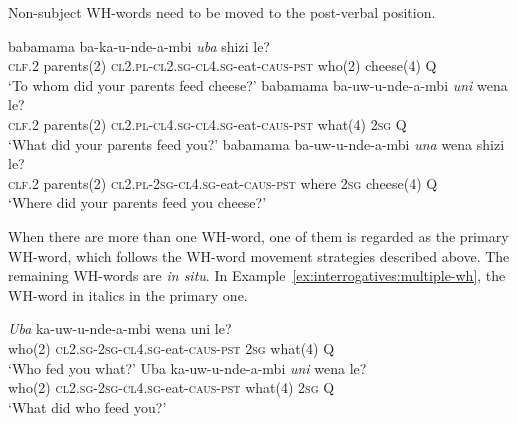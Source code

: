Non-subject WH-words need to be moved to the post-verbal position.

\begin{exe}
\ex
{} babamama ba-ka-u-nde-\textipa{\textbeltl}a-mbi \textit{uba} shizi le? \\
\textsc{clf.2} parents(2) \textsc{cl2.pl}-\textsc{cl2.sg}-\textsc{cl4.sg}-eat-\textsc{caus}-\textsc{pst} who(2) cheese(4) Q \\
\trans `To whom did your parents feed cheese?'
\ex
{} babamama ba-uw-u-nde-\textipa{\textbeltl}a-mbi \textit{uni} wena le? \\
\textsc{clf.2} parents(2) \textsc{cl2.pl}-\textsc{cl4.sg}-\textsc{cl4.sg}-eat-\textsc{caus}-\textsc{pst} what(4) \textsc{2sg} Q \\
\trans `What did your parents feed you?'
\ex
{} babamama ba-uw-u-nde-\textipa{\textbeltl}a-mbi \textit{una} wena shizi le? \\
\textsc{clf.2} parents(2) \textsc{cl2.pl}-\textsc{2sg}-\textsc{cl4.sg}-eat-\textsc{caus}-\textsc{pst} where \textsc{2sg} cheese(4) Q \\
\trans `Where did your parents feed you cheese?'
\end{exe}

When there are more than one WH-word, one of them is regarded as the primary WH-word, which follows the WH-word movement strategies described above. The remaining WH-words are \textit{in situ}. In Example~\ref{ex:interrogatives:multiple-wh}, the WH-word in italics in the primary one.

\begin{exe}
\ex
\begin{xlist}
\ex
\gll \textit{Uba} ka-uw-u-nde-\textipa{\textbeltl}a-mbi wena uni le? \\
who(2) \textsc{cl2.sg}-\textsc{2sg}-\textsc{cl4.sg}-eat-\textsc{caus}-\textsc{pst} \textsc{2sg} what(4) Q \\
\trans `Who fed you what?'
\ex
\gll Uba ka-uw-u-nde-\textipa{\textbeltl}a-mbi \textit{uni} wena le? \\
who(2) \textsc{cl2.sg}-\textsc{2sg}-\textsc{cl4.sg}-eat-\textsc{caus}-\textsc{pst} what(4) \textsc{2sg} Q \\
\trans `What did who feed you?'
\end{xlist}
\label{ex:interrogatives:multiple-wh}
\end{exe}
